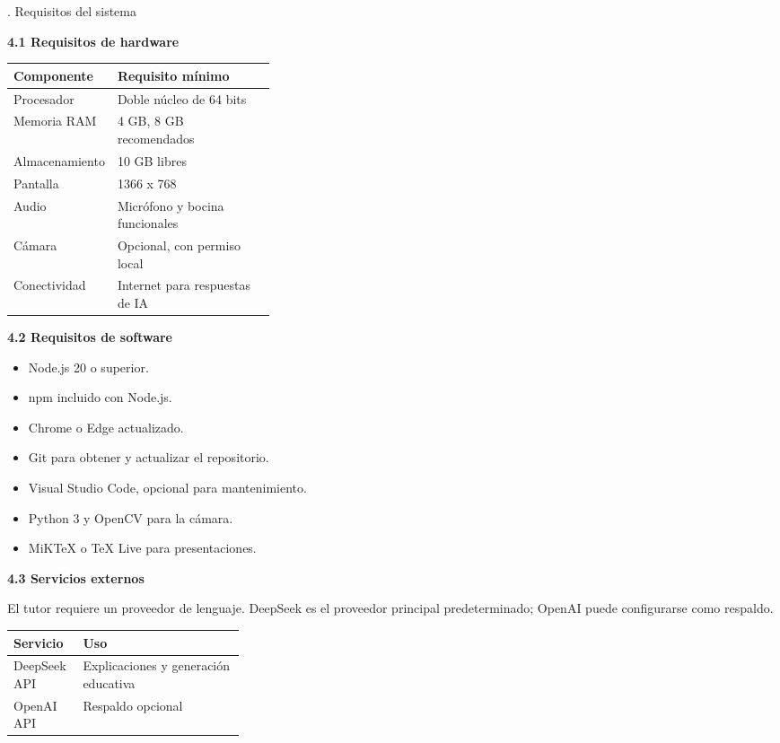 \documentclass[11pt]{article}
\newcommand{\SectionNum}[2]{%
  \par\phantomsection\label{sec:#1}%
  {\normalfont\fontsize{14}{17}\selectfont #1. #2\par}%
  \vspace{7pt}%
}
\newcommand{\SubsectionNum}[2]{%
  \par\vspace{4pt}%
  {\normalfont\fontsize{12}{16.7}\selectfont\bfseries #1 #2\par}%
  \vspace{3pt}%
}
\begin{document}
\clearpage
\SectionNum{4}{Requisitos del sistema}
\SubsectionNum{4.1}{Requisitos de hardware}
\begin{center}
\renewcommand{\arraystretch}{1.18}
\begin{tabularx}{0.92\linewidth}{|>{\raggedright\arraybackslash}p{0.34\linewidth}|X|}
\hline
\rowcolor{tablehead}\textbf{Componente} & \textbf{Requisito mínimo}\\
\hline
Procesador & Doble núcleo de 64 bits\\
\hline
Memoria RAM & 4 GB, 8 GB recomendados\\
\hline
Almacenamiento & 10 GB libres\\
\hline
Pantalla & 1366 x 768\\
\hline
Audio & Micrófono y bocina funcionales\\
\hline
Cámara & Opcional, con permiso local\\
\hline
Conectividad & Internet para respuestas de IA\\
\hline
\end{tabularx}
\end{center}

\SubsectionNum{4.2}{Requisitos de software}
\begin{itemize}
  \item Node.js 20 o superior.
  \item npm incluido con Node.js.
  \item Chrome o Edge actualizado.
  \item Git para obtener y actualizar el repositorio.
  \item Visual Studio Code, opcional para mantenimiento.
  \item Python 3 y OpenCV para la cámara.
  \item MiKTeX o TeX Live para presentaciones.
\end{itemize}

\clearpage
\SubsectionNum{4.3}{Servicios externos}
El tutor requiere un proveedor de lenguaje. DeepSeek es el proveedor principal predeterminado; OpenAI puede configurarse como respaldo.

\begin{center}
\begin{tabularx}{0.92\linewidth}{|>{\raggedright\arraybackslash}p{0.30\linewidth}|X|}
\hline
\rowcolor{tablehead}\textbf{Servicio} & \textbf{Uso}\\
\hline
DeepSeek API & Explicaciones y generación educativa\\
\hline
OpenAI API & Respaldo opcional\\
\hline
\end{tabularx}
\end{center}
\end{document}

